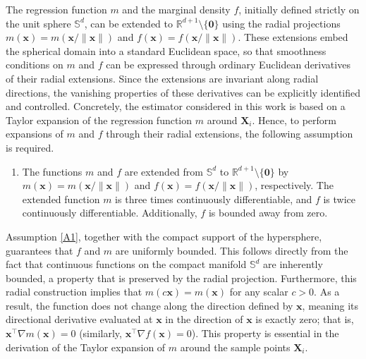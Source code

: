\documentclass[12pt]{report} %
\newcommand{\bX}{\mathbf{X}}
\newcommand{\bx}{\mathbf{x}}
\newcommand{\Sd}{\mathbb{S}^{d}}
\begin{document}
The regression function $m$ and the marginal density $f$, initially defined strictly on the unit sphere $\Sd$, can be extended to $\mathbb{R}^{d+1} \setminus \{\mathbf{0}\}$ using the radial projections $m(\bx) = m(\bx/\|\bx\|)$ and $f(\bx) = f(\bx/\|\bx\|)$. These extensions embed the spherical domain into a standard Euclidean space, so that smoothness conditions on $m$ and $f$ can be expressed through ordinary Euclidean derivatives of their radial extensions. Since the extensions are invariant along radial directions, the vanishing properties of these derivatives can be explicitly identified and controlled. 
Concretely, the estimator considered in this work is based on a Taylor expansion of the regression function $m$ around $\bX_i$. Hence, to perform expansions of $m$ and $f$ through their radial extensions, the following assumption is required.
\begin{enumerate}[label=
(\textbf{A\arabic{*}}), ref=\textbf{(A\arabic*)}]
    \item \label{A1} The functions $m$ and $f$ are extended from $\Sd$ to $\mathbb{R}^{d+1} \setminus \{\mathbf{0}\}$ by $m(\bx) = m(\bx/\|\bx\|)$ and $f(\bx) = f(\bx/\|\bx\|)$, respectively. The extended function $m$ is three times continuously differentiable, and $f$ is twice continuously differentiable. Additionally, $f$ is bounded away from zero.
\end{enumerate}


Assumption \ref{A1}, together with the compact support of the hypersphere, guarantees that $f$ and $m$ are uniformly bounded. This follows directly from the fact that continuous functions on the compact manifold $\Sd$ are inherently bounded, a property that is preserved by the radial projection. Furthermore, this radial construction implies that $m(c\bx) = m(\bx)$ for any scalar $c > 0$. As a result, the function does not change along the direction defined by $\bx$, meaning its directional derivative evaluated at $\bx$ in the direction of $\bx$ is exactly zero; that is, $\bx^\top \nabla m(\bx) = 0$ (similarly, $\bx^\top \nabla f(\bx) = 0$). This property is essential in the derivation of the Taylor expansion of $m$ around the sample points $\bX_i$. 
\end{document}
